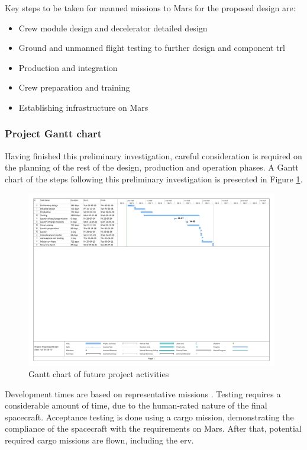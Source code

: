 Key steps to be taken for manned missions to Mars for the proposed design are:
\begin{itemize}
\item Crew module design and decelerator detailed design
\item Ground and unmanned flight testing to further design and component \gls{trl}
\item Production and integration
\item Crew preparation and training
\item Establishing infrastructure on Mars
\end{itemize}

\subsubsection{Project Gantt chart}
Having finished this preliminary investigation, careful consideration is required on the planning of the rest of the design, production and operation phases. A Gantt chart of the steps following this preliminary investigation is presented in Figure \ref{fig:projectganttchart}.\\

\begin{figure}[h]
	\centering
	\includegraphics[width=0.98\textwidth]{./Figure/Schedule/ProjectGanttChart_v2_cropped.pdf}
	\caption{Gantt chart of future project activities}
	\label{fig:projectganttchart}
\end{figure}

Development times are based on representative missions \cite{Wertz2011}. Testing requires a considerable amount of time, due to the human-rated nature of the final spacecraft. Acceptance testing is done using a cargo mission, demonstrating the compliance of the spacecraft with the requirements on Mars. After that, potential required cargo missions are flown, including the \gls{erv}.


